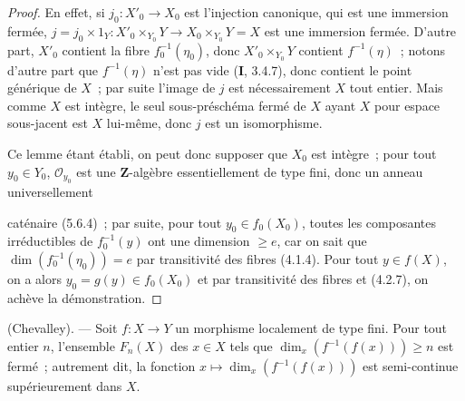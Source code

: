 \begin{proof}
En effet, si $j_0:X'_0\to X_0$ est l'injection canonique, qui est une immersion
fermée, $j=j_0\times 1_Y:X'_0\times_{Y_0}Y\to X_0\times_{Y_0}Y=X$ est une
immersion fermée. D'autre part, $X'_0$ contient la fibre
$f_0^{-1}(\eta_0)$, donc $X'_0\times_{Y_0}Y$ contient $f^{-1}(\eta)$~;
notons d'autre part que $f^{-1}(\eta)$ n'est pas vide (\textbf{I}, 3.4.7),
donc contient le point générique de $X$~; par suite l'image de $j$ est
nécessairement $X$ tout entier. Mais comme $X$ est intègre, le seul
sous-préschéma fermé de $X$ ayant $X$ pour espace sous-jacent est $X$
lui-même, donc $j$ est un isomorphisme.

Ce lemme étant établi, on peut donc supposer que $X_0$ est intègre~; pour tout
$y_0\in Y_0$, $\mathcal O_{y_0}$ est une $\mathbf Z$-algèbre essentiellement
de type fini, donc un anneau universellement

caténaire (5.6.4)~; par suite, pour tout $y_0\in f_0(X_0)$, toutes les
composantes irréductibles de $f_0^{-1}(y)$ ont une dimension $\geq e$, car on
sait que $\dim(f_0^{-1}(\eta_0))=e$ par transitivité des fibres (4.1.4). Pour
tout $y\in f(X)$, on a alors $y_0=g(y)\in f_0(X_0)$ et par transitivité des
fibres et (4.2.7), on achève la démonstration.
\end{proof}

\begin{theorem}[13.1.3]
\label{IV.13.1.3-fr}
\textnormal{(Chevalley).} --- Soit $f:X\to Y$ un morphisme localement de type
fini. Pour tout entier $n$, l'ensemble $F_n(X)$ des $x\in X$ tels que
$\dim_x(f^{-1}(f(x)))\geq n$ est fermé~; autrement dit, la fonction
$x\mapsto\dim_x(f^{-1}(f(x)))$ est semi-continue supérieurement dans $X$.
\end{theorem}

